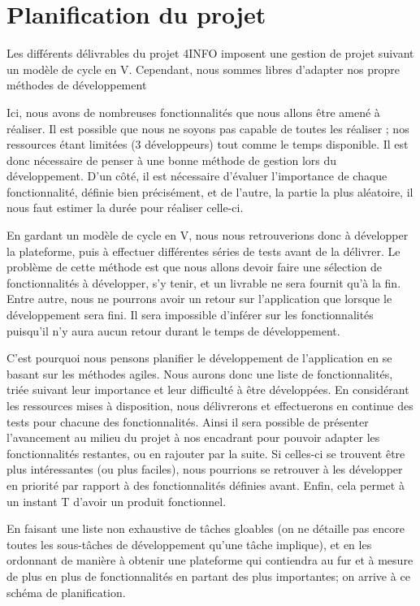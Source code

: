 \section{Planification du projet}
\label{sec:orga}

	Les différents délivrables du projet 4INFO imposent une gestion de projet suivant un modèle de cycle en V. Cependant, nous sommes libres d'adapter nos propre méthodes de développement 

	Ici, nous avons de nombreuses fonctionnalités que nous allons être amené à réaliser. Il est possible que nous ne soyons pas capable de toutes les réaliser ; nos ressources étant limitées (3 développeurs) tout comme le temps disponible. Il est donc nécessaire de penser à une bonne méthode de gestion lors du développement. D'un côté, il est nécessaire d'évaluer l'importance de chaque fonctionnalité, définie bien précisément, et de l'autre, la partie la plus aléatoire, il nous faut estimer la durée pour réaliser celle-ci.

	En gardant un modèle de cycle en V, nous nous retrouverions donc à développer la plateforme, puis à effectuer différentes séries de tests avant de la délivrer. Le problème de cette méthode est que nous allons devoir faire une sélection de fonctionnalités à développer, s'y tenir, et un livrable ne sera fournit qu'à la fin. Entre autre, nous ne pourrons avoir un retour sur l'application que lorsque le développement sera fini. Il sera impossible d'inférer sur les fonctionnalités puisqu'il n'y aura aucun retour durant le temps de développement. 

	C'est pourquoi nous pensons planifier le développement de l'application en se basant sur les méthodes agiles. Nous aurons donc une liste de fonctionnalités, triée suivant leur importance et leur difficulté à être développées. En considérant les ressources mises à disposition, nous délivrerons et effectuerons en continue des tests pour chacune des fonctionnalités. Ainsi il sera possible de présenter l'avancement au milieu du projet à nos encadrant pour pouvoir adapter les fonctionnalités restantes, ou en rajouter par la suite. Si celles-ci se trouvent être plus intéressantes (ou plus faciles), nous pourrions se retrouver à les développer en priorité par rapport à des fonctionnalités définies avant. Enfin, cela permet à un instant T d'avoir un produit fonctionnel.

	En faisant une liste non exhaustive de tâches gloables (on ne détaille pas encore toutes les sous-tâches de développement qu'une tâche implique), et en les ordonnant de manière à obtenir une plateforme qui contiendra au fur et à mesure de plus en plus de fonctionnalités en partant des plus importantes; on arrive à ce schéma de planification.
